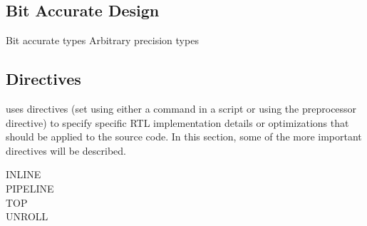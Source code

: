 \subsection{Bit Accurate Design}
\label{hls:bitAccurate}
Bit accurate types
Arbitrary precision types

\subsection{Directives}
\label{hls:directives}
\nocite{Xilinx:ReferenceGuide}
 uses directives (set using either a command in a
 script or using the  preprocessor
directive) to specify specific \gls{RTL} implementation details or optimizations
that should be applied to the source code. In this section, some of the more
important directives will be described.

\begin{description}
\item[INLINE]
\item[PIPELINE]
\item[TOP]
\item[UNROLL]
\end{description}

